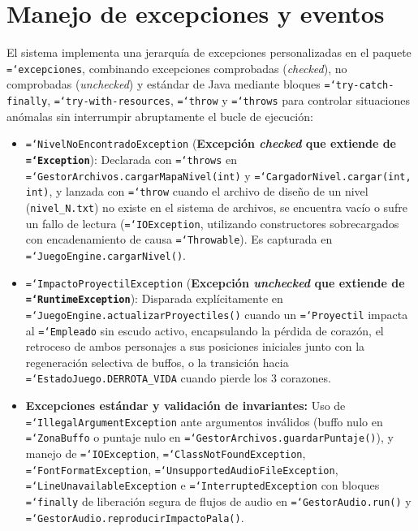 \documentclass[12pt, a4paper]{article}
\DeclareRobustCommand{\code}[1]{\textcolor{codegreen}{\texttt{\hyphenchar\font=`\-#1}}}
\begin{document}
\section{Manejo de excepciones y eventos}

El sistema implementa una jerarquía de excepciones personalizadas en el paquete \code{excepciones}, combinando excepciones comprobadas (\textit{checked}), no comprobadas (\textit{unchecked}) y estándar de Java mediante bloques \code{try-catch-finally}, \code{try-with-resources}, \code{throw} y \code{throws} para controlar situaciones anómalas sin interrumpir abruptamente el bucle de ejecución:

\begin{itemize}[leftmargin=1.27cm]
    \item \code{NivelNoEncontradoException} (\textbf{Excepción \textit{checked} que extiende de \code{Exception}}): Declarada con \code{throws} en \code{GestorArchivos.cargarMapaNivel(int)} y \code{CargadorNivel.cargar(int, int)}, y lanzada con \code{throw} cuando el archivo de diseño de un nivel (\texttt{nivel\_N.txt}) no existe en el sistema de archivos, se encuentra vacío o sufre un fallo de lectura (\code{IOException}, utilizando constructores sobrecargados con encadenamiento de causa \code{Throwable}). Es capturada en \code{JuegoEngine.cargarNivel()}.
    \item \code{ImpactoProyectilException} (\textbf{Excepción \textit{unchecked} que extiende de \code{RuntimeException}}): Disparada explícitamente en \code{JuegoEngine.actualizarProyectiles()} cuando un \code{Proyectil} impacta al \code{Empleado} sin escudo activo, encapsulando la pérdida de corazón, el retroceso de ambos personajes a sus posiciones iniciales junto con la regeneración selectiva de buffos, o la transición hacia \code{EstadoJuego.DERROTA\_VIDA} cuando pierde los 3 corazones.
    \item \textbf{Excepciones estándar y validación de invariantes:} Uso de \code{IllegalArgumentException} ante argumentos inválidos (buffo nulo en \code{ZonaBuffo} o puntaje nulo en \code{GestorArchivos.guardarPuntaje()}), y manejo de \code{IOException}, \code{ClassNotFoundException}, \code{FontFormatException}, \code{UnsupportedAudioFileException}, \code{LineUnavailableException} e \code{InterruptedException} con bloques \code{finally} de liberación segura de flujos de audio en \code{GestorAudio.run()} y \code{GestorAudio.reproducirImpactoPala()}.
\end{itemize}
\end{document}
